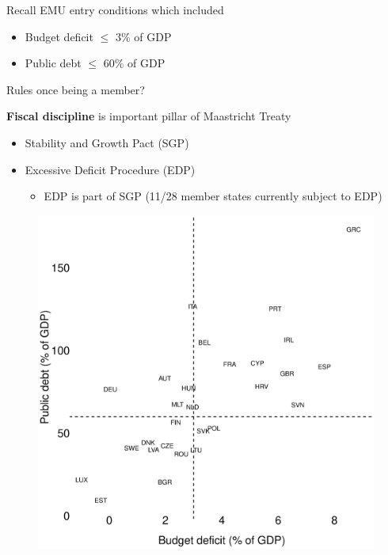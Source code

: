 \documentclass{beamer}
\begin{document}
\begin{frame} 
 Recall EMU entry conditions which included
\begin{itemize}
  \item Budget deficit $\leq$ 3\% of GDP
  \item Public debt $\leq$ 60\% of GDP
\end{itemize}
\medskip
Rules once being a member?
\end{frame}

\begin{frame}
  \textbf{Fiscal discipline} is important pillar of Maastricht Treaty
  \medskip
\begin{itemize}
  \item Stability and Growth Pact (SGP)
  \medskip
  \item Excessive Deficit Procedure (EDP)
  \begin{itemize}
    \item EDP is part of SGP (11/28 member states currently subject to EDP)
  \end{itemize}  
\end{itemize}
\end{frame}

\begin{frame}
  \begin{figure}
    \includegraphics[scale=.3]{fiscal_compliance.eps}
  \end{figure}
\end{frame}
\end{document}
